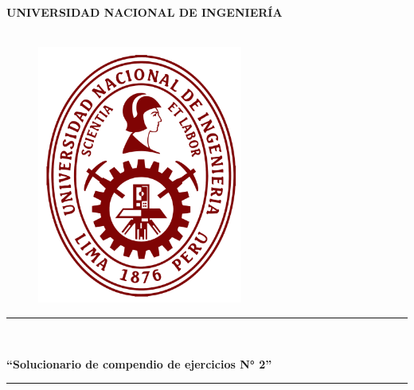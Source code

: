 \begin{titlepage}
    \begin{center}
        {\LARGE \textbf{UNIVERSIDAD NACIONAL DE INGENIER\'IA}}\\
        \vspace{4mm}
        {\Large {}}\\
        \vspace{4mm}

        \begin{figure}[h]
            \centering
            \includegraphics[height=8.5cm]{../assets/images/Logo UNI.png}     
        \end{figure}
        \textcolor{color_uni}{\rule{\linewidth}{0.40mm}}\\
        \begin{spacing}{1}
            \vspace{0.34cm}
            {\Large \textbf{``Solucionario de compendio de ejercicios N° 2''}}\\
        \end{spacing}
        \textcolor{color_uni}{\rule{\linewidth}{0.40mm}}\\
        \vspace{0.4cm}

    \end{center}


\end{titlepage}
